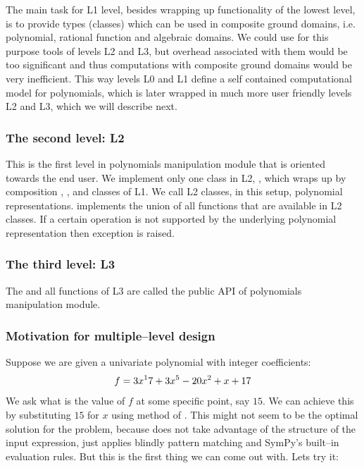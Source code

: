 The main task for L1 level, besides wrapping up functionality of the lowest level, is to
provide types (classes) which can be used in composite ground domains, i.e. polynomial,
rational function and algebraic domains. We could use for this purpose tools of levels L2
and L3, but overhead associated with them would be too significant and thus computations
with composite ground domains would be very inefficient. This way levels L0 and L1 define
a self contained computational model for polynomials, which is later wrapped in much more
user friendly levels L2 and L3, which we will describe next.


\subsubsection{The second level: L2}

This is the first level in polynomials manipulation module that is oriented towards the end
user. We implement only one class in L2, , which wraps up by composition ,
,  and  classes of L1. We call L2 classes, in this setup, polynomial
representations.  implements the union of all functions that are available in L2
classes. If a certain operation is not supported by the underlying polynomial representation
then  exception is raised.


\subsubsection{The third level: L3}

The  and all functions of L3 are called the public API of polynomials manipulation
module.


\subsubsection{Motivation for multiple--level design}

Suppose we are given a univariate polynomial with integer coefficients:
\begin{gather}
\begin{split}f = 3 x^17 + 3 x^5 - 20 x^2 + x + 17\end{split}\notag
\end{gather}
We ask what is the value of $f$ at some specific point, say $15$. We can achieve this by
substituting $15$ for $x$ using  method of . This might not seem to
be the optimal solution for the problem, because  does not take advantage of
the structure of the input expression, just applies blindly pattern matching and SymPy's
built--in evaluation rules. But this is the first thing we can come out with. Lets try it:

